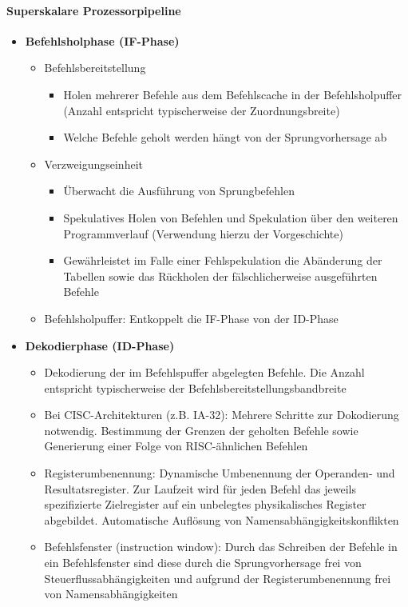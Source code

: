 \paragraph{Superskalare Prozessorpipeline}
\begin{itemize}
	\item \textbf{Befehlsholphase (IF-Phase)}
	\begin{itemize}
		\item Befehlsbereitstellung
		\begin{itemize}
			\item Holen mehrerer Befehle aus dem Befehlscache in der Befehlsholpuffer (Anzahl entspricht typischerweise der Zuordnungsbreite)
			\item Welche Befehle geholt werden hängt von der Sprungvorhersage ab
		\end{itemize}
		\item Verzweigungseinheit
		\begin{itemize}
			\item Überwacht die Ausführung von Sprungbefehlen
			\item Spekulatives Holen von Befehlen und Spekulation über den weiteren Programmverlauf (Verwendung hierzu der Vorgeschichte)
			\item Gewährleistet im Falle einer Fehlspekulation die Abänderung der Tabellen sowie das Rückholen der fälschlicherweise ausgeführten Befehle
		\end{itemize}
		\item Befehlsholpuffer: Entkoppelt die IF-Phase von der ID-Phase
	\end{itemize}
	\item \textbf{Dekodierphase (ID-Phase)}
	\begin{itemize}
		\item Dekodierung der im Befehlspuffer abgelegten Befehle. Die Anzahl entspricht typischerweise der Befehlsbereitstellungsbandbreite
		\item Bei CISC-Architekturen (z.B. IA-32): Mehrere Schritte zur Dokodierung notwendig. Bestimmung der Grenzen der geholten Befehle sowie Generierung einer Folge von RISC-ähnlichen Befehlen %
		\item Registerumbenennung: Dynamische Umbenennung der Operanden- und Resultatsregister. Zur Laufzeit wird für jeden Befehl das jeweils spezifizierte Zielregister auf ein unbelegtes physikalisches Register abgebildet. Automatische Auflösung von Namensabhängigkeitskonflikten
		\item Befehlsfenster (instruction window): Durch das Schreiben der Befehle in ein Befehlsfenster sind diese durch die Sprungvorhersage frei von Steuerflussabhängigkeiten und aufgrund der Registerumbenennung frei von Namensabhängigkeiten

\end{itemize}
\end{itemize}
